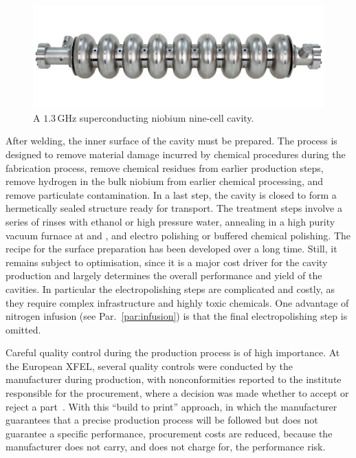 \begin{figure}[htbp]
   \includegraphics[width=\hsize]{chapters/figures/tesla9cell-cavity-2}
\caption{A $1.3\,{\mathrm{GHz}}$ superconducting niobium nine-cell cavity.
}
\label{fig:tesla-cavity}
\end{figure}

After welding, the inner surface of the cavity must be prepared.
The process is designed to remove material damage incurred by chemical procedures during the fabrication process, remove chemical residues from earlier production steps, remove hydrogen in the bulk niobium from earlier chemical processing, and remove particulate contamination.
In a last step, the cavity is closed to form a hermetically sealed structure ready for transport.
The treatment steps involve a series of rinses with ethanol or high pressure water, annealing in a high purity vacuum furnace at  and , and electro polishing or buffered chemical polishing.
The recipe for the surface preparation has been developed over a long time.  Still, it remains subject to optimisation, since it is a major cost driver for the cavity production and largely determines the overall performance and yield of the cavities.
In particular the electropolishing steps are complicated and costly, as they require complex infrastructure and highly toxic chemicals.
One advantage of nitrogen infusion (see Par.~\ref{par:infusion}) 
is that the final electropolishing step is omitted.

Careful quality control during the production process is of high importance.
At the European XFEL, several quality controls were conducted by the manufacturer during production, with nonconformities reported to the institute responsible for the procurement, where a decision was made whether to accept or reject a part~\cite{Singer:2016fbf}. 
With this ``build to print'' approach, in which the manufacturer guarantees that a precise production process will be followed but does not guarantee a specific performance, procurement costs are reduced, because the manufacturer does not carry, and does not charge for,  the performance risk.

